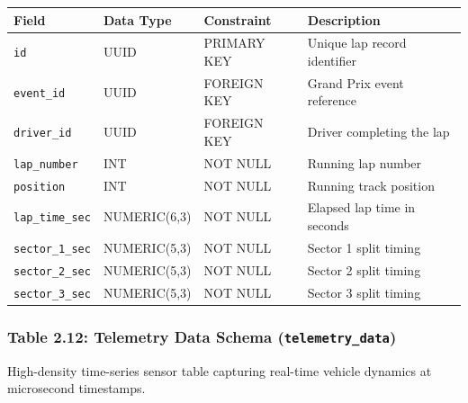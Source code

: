 \documentclass[12pt,a4paper]{report}
\begin{document}
\begin{table}[H]
\centering
\small
\begin{tabularx}{\textwidth}{l p{2.6cm} p{2.6cm} X}
\toprule
\rowcolor{gray!15}
\textbf{Field} & \textbf{Data Type} & \textbf{Constraint} & \textbf{Description} \\
\midrule
\texttt{id} & UUID & PRIMARY KEY & Unique lap record identifier \\
\texttt{event\_id} & UUID & FOREIGN KEY & Grand Prix event reference \\
\texttt{driver\_id} & UUID & FOREIGN KEY & Driver completing the lap \\
\texttt{lap\_number} & INT & NOT NULL & Running lap number \\
\texttt{position} & INT & NOT NULL & Running track position \\
\texttt{lap\_time\_sec} & NUMERIC(6,3) & NOT NULL & Elapsed lap time in seconds \\
\texttt{sector\_1\_sec} & NUMERIC(5,3) & NOT NULL & Sector 1 split timing \\
\texttt{sector\_2\_sec} & NUMERIC(5,3) & NOT NULL & Sector 2 split timing \\
\texttt{sector\_3\_sec} & NUMERIC(5,3) & NOT NULL & Sector 3 split timing \\
\bottomrule
\end{tabularx}
\end{table}

\vspace{0.3cm}
\subsubsection*{Table 2.12: Telemetry Data Schema (\textnormal{\texttt{telemetry\_data}})}
High-density time-series sensor table capturing real-time vehicle dynamics at microsecond timestamps.
\end{document}
